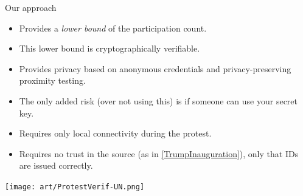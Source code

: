 \begin{columns}[t]
\begin{column}{0.32\linewidth}
    \begin{greenblock}{Our approach}
      \begin{itemize}
        \item Provides a \emph{lower bound} of the participation count.
        \item This lower bound is cryptographically verifiable.
        \item Provides privacy based on anonymous credentials and 
          privacy-preserving proximity testing.
        \item The only added risk (over not using this) is if someone can use 
          your secret key.
        \item Requires only local connectivity during the protest.
        \item Requires no trust in the source (as in \cref{TrumpInauguration}), 
          only that IDs are issued correctly.
      \end{itemize}
    \end{greenblock}

    \texttt{[image: art/ProtestVerif-UN.png]}

  \end{column}

\end{columns}

\vfill

